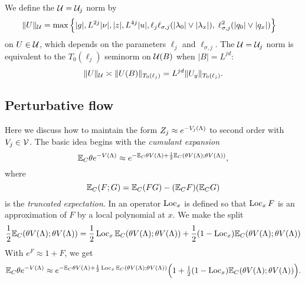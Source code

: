 We define the $\mathcal{U} = \mathcal{U}_j$ norm by
\begin{equation}
\label{e:Vnormdef}
\begin{aligned}
\|U\|_{\mathcal{U}} &=
\max\Big\{
|g|, L^{2j}|\nu|, |z|, L^{4j}|u|,
\ell_j\ell_{\sigma,j}(|\lambda_0|\vee|\lambda_x|),\;
 \ell_{\sigma,j}^{2} (|q_0|\vee|q_x|)
\Big\}
\end{aligned}
\end{equation}
on $U \in \mathcal{U}$, which depends on the parameters $\ell_j$ and $\ell_{\sigma,j}$.
The $\mathcal{U} = \mathcal{U}_j$ norm is equivalent to the $T_0(\ell_j)$ seminorm on $\mathcal{U}(B)$
when $|B| = L^{jd}$:
\begin{equation}
\|U\|_{\mathcal{U}} \asymp \|U(B)\|_{T_0(\ell_j)} = L^{jd} \|U_y\|_{T_0(\ell_j)}.
\end{equation}


\subsection{Perturbative flow}
\label{sec:pt}

Here we discuss how to maintain the form $Z_j \approx e^{-V_j(\Lambda)}$ to
second order with $V_j\in\mathcal{V}$. The basic idea begins with the \emph{cumulant
expansion}
\begin{equation}
\mathbb{E}_C \theta e^{-V(\Lambda)}
	\approx
e^{-\mathbb{E}_C \theta V(\Lambda) + \scriptstyle{\frac12} \mathbb{E}_C (\theta V(\Lambda); \theta V(\Lambda))},
\end{equation}
where
\begin{equation}
\mathbb{E}_C (F; G) = \mathbb{E}_C (FG) - (\mathbb{E}_C F) (\mathbb{E}_C G)
\end{equation}
is the \emph{truncated expectation}.
In \cite{BS-rg-loc} an operator $\operatorname{Loc}_x$ is defined so that $\operatorname{Loc}_x F$ is an
approximation of $F$ by a local polynomial at $x$. We make the split
\begin{equation}
\frac12 \mathbb{E}_C (\theta V(\Lambda); \theta V(\Lambda))
	=
\frac12 \operatorname{Loc}_x \mathbb{E}_C (\theta V(\Lambda); \theta V(\Lambda))
	+
\frac12 (1 - \operatorname{Loc}_x) \mathbb{E}_C (\theta V(\Lambda); \theta V(\Lambda))
\end{equation}
With
$e^F \approx 1 + F$, we get
\begin{equation}
\mathbb{E}_C \theta e^{-V(\Lambda)}
	\approx
e^{-\mathbb{E}_C \theta V(\Lambda)
	+
\scriptstyle{\frac12} \operatorname{Loc}_x \mathbb{E}_C (\theta V(\Lambda); \theta V(\Lambda))}
\Big(1 + \tfrac12 (1 - \operatorname{Loc}_x) \mathbb{E}_C (\theta V(\Lambda); \theta V(\Lambda))\Big).
\end{equation}

